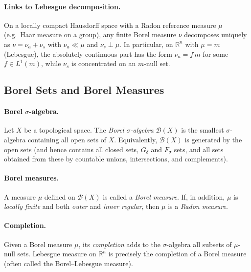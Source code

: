 \documentclass[12pt,a4paper]{article}
\theoremstyle{plain}
\theoremstyle{definition}
\theoremstyle{remark}
\theoremstyle{remark}
\theoremstyle{definition}
\begin{document}
	\bigskip
	
	\paragraph{Links to Lebesgue decomposition.}
	On a locally compact Hausdorff space with a Radon reference measure $\mu$ (e.g.\ Haar measure on a group),
	any finite Borel measure $\nu$ decomposes uniquely as $\nu=\nu_a+\nu_s$ with $\nu_a\ll\mu$ and $\nu_s\perp\mu$.
	In particular, on $\mathbb{R}^n$ with $\mu=m$ (Lebesgue), the absolutely continuous part has the
	form $\nu_a=f\,m$ for some $f\in L^1(m)$, while $\nu_s$ is concentrated on an $m$-null set.
	
	\subsection*{Borel Sets and Borel Measures}
	
\paragraph{Borel $\sigma$-algebra.}
	Let $X$ be a topological space. The \emph{Borel $\sigma$-algebra} $\mathcal{B}(X)$
	is the smallest $\sigma$-algebra containing all open sets of $X$.
	Equivalently, $\mathcal{B}(X)$ is generated by the open sets (and hence contains
	all closed sets, $G_\delta$ and $F_\sigma$ sets, and all sets obtained from these
	by countable unions, intersections, and complements).
	
	\bigskip
	
	\paragraph{Borel measures.}
	A measure $\mu$ defined on $\mathcal{B}(X)$ is called a \emph{Borel measure}.
	If, in addition, $\mu$ is \emph{locally finite} and both \emph{outer} and \emph{inner regular},
	then $\mu$ is a \emph{Radon measure}.
	
	\bigskip
	
	\paragraph{Completion.}
	Given a Borel measure $\mu$, its \emph{completion} adds to the $\sigma$-algebra
	all subsets of $\mu$-null sets. Lebesgue measure on $\mathbb{R}^n$ is precisely
	the completion of a Borel measure (often called the Borel--Lebesgue measure).
	
	\bigskip
	
\end{document}
